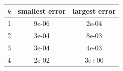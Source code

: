 \begin{tabular}{ccc}
\hline
$k$ & smallest error & largest error \\
\hline
1 & 9e-06 & 2e-04 \\
2 & 3e-04 & 8e-03 \\
3 & 3e-04 & 4e-03 \\
4 & 2e-02 & 3e+00 \\
\hline
\end{tabular}
